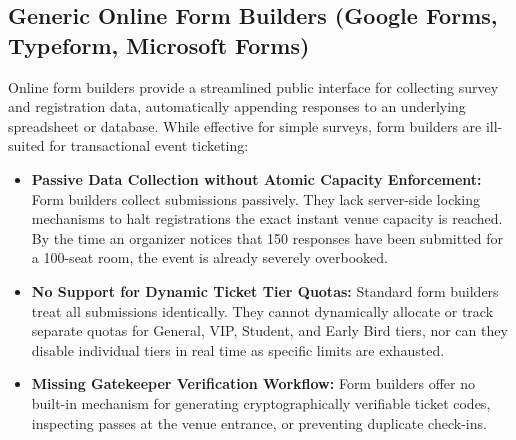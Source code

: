 \documentclass[11pt,a4paper]{report}
\begin{document}
\subsection{Generic Online Form Builders (Google Forms, Typeform, Microsoft Forms)}
Online form builders provide a streamlined public interface for collecting survey and registration data, automatically appending responses to an underlying spreadsheet or database. While effective for simple surveys, form builders are ill-suited for transactional event ticketing:
\begin{itemize}[leftmargin=1.5em, itemsep=0.4em]
    \item \textbf{Passive Data Collection without Atomic Capacity Enforcement:} Form builders collect submissions passively. They lack server-side locking mechanisms to halt registrations the exact instant venue capacity is reached. By the time an organizer notices that 150 responses have been submitted for a 100-seat room, the event is already severely overbooked.
    \item \textbf{No Support for Dynamic Ticket Tier Quotas:} Standard form builders treat all submissions identically. They cannot dynamically allocate or track separate quotas for General, VIP, Student, and Early Bird tiers, nor can they disable individual tiers in real time as specific limits are exhausted.
    \item \textbf{Missing Gatekeeper Verification Workflow:} Form builders offer no built-in mechanism for generating cryptographically verifiable ticket codes, inspecting passes at the venue entrance, or preventing duplicate check-ins.
\end{itemize}
\end{document}
